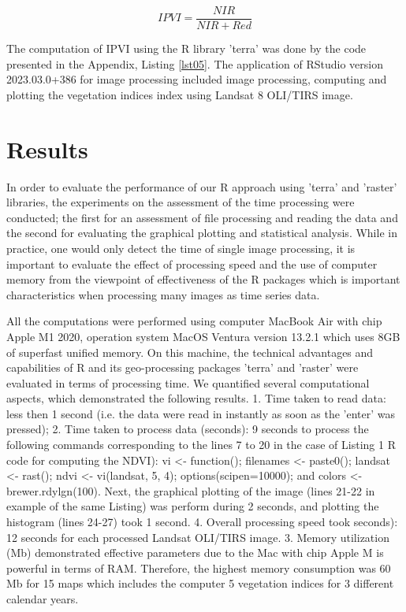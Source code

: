 \documentclass[jimaging,article,submit,pdftex,moreauthors]{Definitions/mdpi}
\begin{document}
\begin{equation}\label{eq:3}
	IPVI=\dfrac{NIR}{NIR + Red}
\end{equation}

The computation of IPVI using the R library 'terra' was done by the code presented in the Appendix, Listing \ref{lst05}. The application of RStudio version 2023.03.0+386 \cite{RStudio} for image processing included image processing, computing and plotting the vegetation indices index using Landsat 8 OLI/TIRS image. 

\section{Results}

In order to evaluate the performance of our R approach using 'terra' and 'raster' libraries, the experiments on the assessment of the time processing were conducted; the first for an assessment of file processing and reading the data and the second for evaluating the graphical plotting and statistical analysis. While in practice, one would only detect the time of single image processing, it is important to evaluate the effect of processing speed and the use of computer memory from the viewpoint of effectiveness of the R packages which is important characteristics when processing many images as time series data.

All the computations were performed using computer MacBook Air with chip Apple M1 2020, operation system MacOS Ventura version 13.2.1 which uses 8GB of superfast unified memory. On this machine, the technical advantages and capabilities of R and its geo-processing packages 'terra' and 'raster' were evaluated in terms of processing time. We quantified several computational aspects, which demonstrated the following results. 1. Time taken to read data: less then 1 second (i.e. the data were read in instantly as soon as the 'enter' was pressed); 2. Time taken to process data (seconds): 9 seconds to process the following commands corresponding to the lines 7 to 20 in the case of Listing 1 R code for computing the NDVI): vi <- function(); filenames <- paste0(); landsat <- rast(); ndvi <- vi(landsat, 5, 4); options(scipen=10000); and colors <- brewer.rdylgn(100). Next, the graphical plotting of the image (lines 21-22 in example of the same Listing) was perform during 2 seconds, and plotting the histogram (lines 24-27) took 1 second. 4. Overall processing speed took seconds): 12 seconds for each processed Landsat OLI/TIRS image. 3. Memory utilization (Mb) demonstrated effective parameters due to the Mac with chip Apple M is powerful in terms of RAM. Therefore, the highest memory consumption was 60 Mb for 15 maps which includes the computer 5 vegetation indices for 3 different calendar years.
\end{document}

